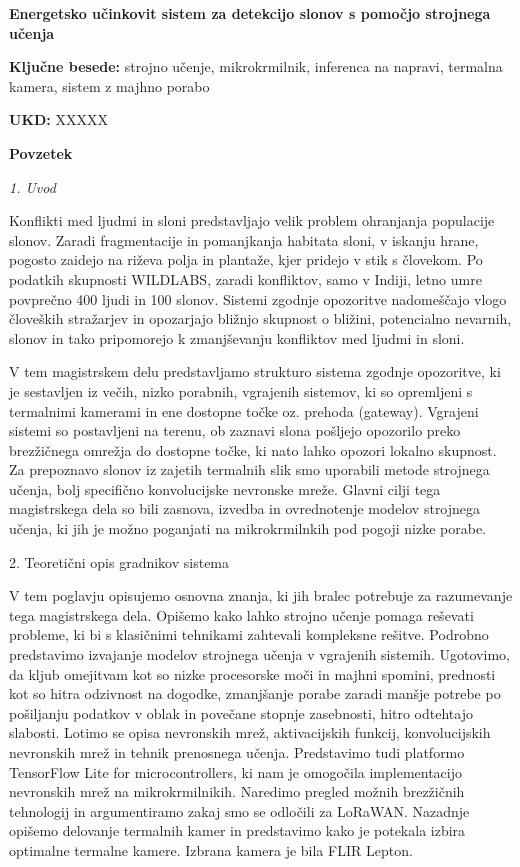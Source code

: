\begin{poglavje}
\noindent\bfseries Energetsko učinkovit sistem za detekcijo slonov s pomočjo strojnega učenja
\end{poglavje}

\bigskip
\bigskip
\bigskip
\bigskip
\bigskip
\textbf{Ključne besede:} strojno učenje, mikrokrmilnik, inferenca na napravi, termalna kamera, sistem z majhno porabo

\bigskip
\textbf{UKD:} XXXXX

\bigskip
\bigskip
\bigskip
\bigskip
\bigskip
\bigskip
\textbf{Povzetek}
\newline
\newline
{\itshape
1. Uvod

Konflikti med ljudmi in sloni predstavljajo velik problem ohranjanja populacije slonov.
Zaradi fragmentacije in pomanjkanja habitata sloni, v iskanju hrane, pogosto zaidejo na riževa polja in plantaže, kjer pridejo v stik s človekom.
Po podatkih skupnosti WILDLABS, zaradi konfliktov, samo v Indiji, letno umre povprečno 400 ljudi in 100 slonov.
Sistemi zgodnje opozoritve nadomeščajo vlogo človeških stražarjev in opozarjajo bližnjo skupnost o bližini, potencialno nevarnih, slonov in tako pripomorejo k zmanjševanju konfliktov med ljudmi in sloni.

V tem magistrskem delu predstavljamo strukturo sistema zgodnje opozoritve, ki je sestavljen iz večih, nizko porabnih, vgrajenih sistemov, ki so opremljeni s termalnimi kamerami in ene dostopne točke oz. prehoda (gateway).
Vgrajeni sistemi so postavljeni na terenu, ob zaznavi slona pošljejo opozorilo preko brezžičnega omrežja do dostopne točke, ki nato lahko opozori lokalno skupnost.
Za prepoznavo slonov iz zajetih termalnih slik smo uporabili metode strojnega učenja, bolj specifično konvolucijske nevronske mreže.
Glavni cilji tega magistrskega dela so bili zasnova, izvedba in ovrednotenje modelov strojnega učenja, ki jih je možno poganjati na mikrokrmilnkih pod pogoji nizke porabe.

2. Teoretični opis gradnikov sistema

V tem poglavju opisujemo osnovna znanja, ki jih bralec potrebuje za razumevanje tega magistrskega dela.
Opišemo kako lahko strojno učenje pomaga reševati probleme, ki bi s klasičnimi tehnikami zahtevali kompleksne rešitve. 
Podrobno predstavimo izvajanje modelov strojnega učenja v vgrajenih sistemih.
Ugotovimo, da kljub omejitvam kot so nizke procesorske moči in majhni spomini, prednosti kot so hitra odzivnost na dogodke, zmanjšanje porabe zaradi manšje potrebe po pošiljanju podatkov v oblak in povečane stopnje zasebnosti, hitro odtehtajo slabosti.
Lotimo se opisa nevronskih mrež, aktivacijskih funkcij, konvolucijskih nevronskih mrež in tehnik prenosnega učenja.
Predstavimo tudi platformo TensorFlow Lite for microcontrollers, ki nam je omogočila implementacijo nevronskih mrež na mikrokrmilnikih.
Naredimo pregled možnih brezžičnih tehnologij in argumentiramo zakaj smo se odločili za LoRaWAN.
Nazadnje opišemo delovanje termalnih kamer in predstavimo kako je potekala izbira optimalne termalne kamere.
Izbrana kamera je bila FLIR Lepton.
\newline

}
